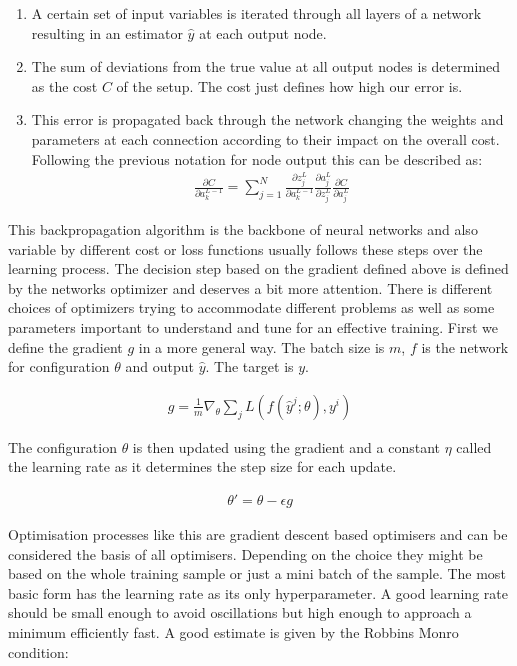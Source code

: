 \begin{enumerate}
    \item A certain set of input variables is iterated through all layers of a network resulting in an estimator $\hat{y}$ at each output node.
    \item The sum of deviations from the true value at all output nodes is determined as the cost $C$ of the setup. The cost just defines how high our error is.
    \item This error is propagated back through the network changing the weights and parameters at each connection according to their impact on the overall cost. Following the previous notation for node output this can be described as:\\
    \begin{align*}
        \frac{\partial C}{\partial a_k^{L-1}} = \sum_{j=1}^N \frac{\partial z_j^L}{\partial a_k^{L-1}} \frac{\partial a_j^L}{\partial z_j^L}\frac{\partial C}{\partial a_j^L}
    \end{align*}
\end{enumerate}

This backpropagation algorithm is the backbone of neural networks and also variable by different cost or loss functions usually follows these steps over the learning process. The decision step based on the gradient defined above is defined by the networks optimizer and deserves a bit more attention. There is different choices of optimizers trying to accommodate different problems as well as some parameters important to understand and tune for an effective training. First we define the gradient $g$ in a more general way. The batch size is $m$, $f$ is the network for configuration $\theta$ and output $\hat{y}$. The target is $y$.

\begin{align}
    g = \frac{1}{m} \nabla_{\theta} \sum_j L(f(\hat{y}^j; \theta), y^i)
\end{align}

The configuration $\theta$ is then updated using the gradient and a constant $\eta$ called the learning rate as it determines the step size for each update.

\begin{align}
    \theta \prime = \theta - \epsilon g
\end{align}

Optimisation processes like this are gradient descent based optimisers and can be considered the basis of all optimisers. Depending on the choice they might be based on the whole training sample or just a mini batch of the sample. The most basic form has the learning rate as its only hyperparameter. A good learning rate should be small enough to avoid oscillations but high enough to approach a minimum efficiently fast. A good estimate is given by the Robbins Monro condition:


